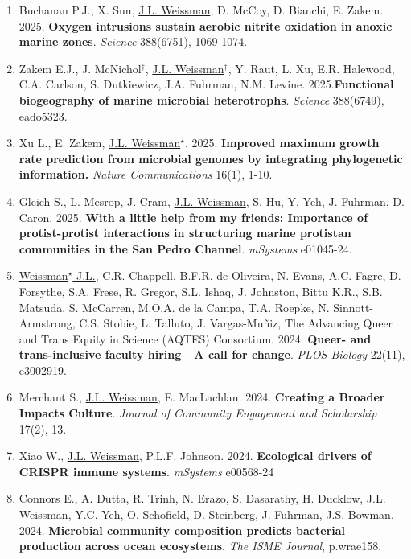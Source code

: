 \documentclass[]{res}
\begin{document}
\begin{resume}
\begin{enumerate}[leftmargin=*]
\item Buchanan P.J., X. Sun, \underline{J.L. Weissman}, D. McCoy, D. Bianchi, E. Zakem. 2025. {\bf Oxygen intrusions sustain aerobic nitrite 
oxidation in anoxic marine zones}. \emph{Science} 388(6751), 1069-1074.
 
 
\item Zakem E.J., J. McNichol$^\dagger$, \underline{J.L. Weissman}$^\dagger$, Y. Raut, L. Xu, E.R. Halewood, C.A. Carlson, S. Dutkiewicz, J.A. Fuhrman, N.M. Levine. 2025.{\bf Functional biogeography of marine microbial heterotrophs}. \emph{Science} 388(6749), eado5323.
 
\item Xu L., E. Zakem, \underline{J.L. Weissman$^\star$}. 2025. {\bf Improved maximum growth rate prediction from microbial genomes by integrating phylogenetic information.} \emph{Nature Communications} 16(1), 1-10.

\item Gleich S., L. Mesrop, J. Cram, \underline{J.L. Weissman}, S. Hu, Y. Yeh, J. Fuhrman, D. Caron. 2025. {\bf With a little help from my friends: Importance of protist-protist interactions in structuring marine protistan communities in the San Pedro Channel}. \emph{mSystems} e01045-24.
 
\item \underline{Weissman$^\star$ J.L.}, C.R. Chappell, B.F.R. de Oliveira, N. Evans, A.C. Fagre, D. Forsythe, S.A. Frese, R. Gregor, S.L. Ishaq, J. Johnston, Bittu K.R., S.B. Matsuda, S. McCarren, M.O.A. de la Campa, T.A. Roepke, N. Sinnott-Armstrong, C.S. Stobie, L. Talluto, J. Vargas-Muñiz, The Advancing Queer and Trans Equity in Science (AQTES) Consortium. 2024. {\bf Queer- and trans-inclusive faculty hiring—A call for change}. \emph{PLOS Biology} 22(11), e3002919.
 
 \item Merchant S., \underline{J.L. Weissman}, E. MacLachlan. 2024. {\bf Creating a Broader Impacts Culture}. \emph{Journal of Community Engagement and Scholarship} 17(2), 13.
 
 \item Xiao W., \underline{J.L. Weissman}, P.L.F. Johnson. 2024. {\bf Ecological drivers of CRISPR immune systems}. \emph{mSystems} e00568-24
 
 \item Connors E., A. Dutta, R. Trinh, N. Erazo, S. Dasarathy, H. Ducklow, \underline{J.L. Weissman}, Y.C. Yeh, O. Schofield, D. Steinberg, J. Fuhrman, J.S. Bowman. 2024. {\bf Microbial community composition predicts bacterial production across ocean ecosystems}. \emph{The ISME Journal}, p.wrae158.


\end{enumerate}
\end{resume}
\end{document}
